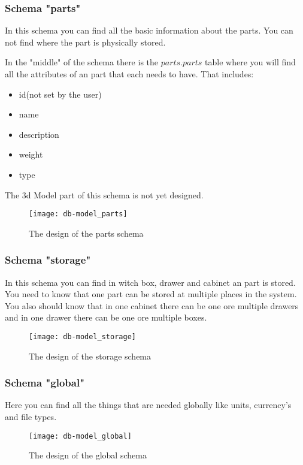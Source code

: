 \newpage
\subsubsection{Schema "parts"}
In this schema you can find all the basic information about the parts. You can not find where the part is physically stored.

In the "middle" of the schema there is the $parts.parts$ table where you will find all the attributes of an part that each needs to have. That includes:
\begin{itemize}
	\item id(not set by the user)
	\item name
	\item description
	\item weight
	\item type
\end{itemize}

The 3d Model part of this schema is not yet designed.

\begin{figure}
\texttt{[image: db-model\_parts]}
\centering
\caption{The design of the parts schema}
\end{figure}

\newpage
\subsubsection{Schema "storage"}
In this schema you can find in witch box, drawer and cabinet an part is stored. You need to know that one part can be stored at multiple places in the system. You also should know that in one cabinet there can be one ore multiple drawers and in one drawer there can be one ore multiple boxes.

\begin{figure}
	\texttt{[image: db-model\_storage]}
	\centering
	\caption{The design of the storage schema}
\end{figure}

\newpage
\subsubsection{Schema "global"}
Here you can find all the things that are needed globally like units, currency's and file types.

\begin{figure}[h]
	\texttt{[image: db-model\_global]}
	\centering
	\caption{The design of the global schema}
\end{figure}

